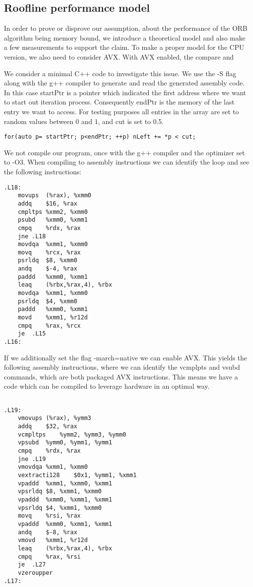 \documentclass[]{article}
\begin{document}
\subsection{Roofline performance model}


In order to prove or disprove our assumption, about the performance of the ORB algorithm being memory bound, we introduce a theoretical model and also make a few measurements to support the claim. 
To make a proper model for the CPU version, we also need to consider AVX. With AVX enabled, the compare and 

We consider a minimal C++ code to investigate this issue. We use the -S flag along with the g++ compiler to generate and read the generated assembly code. In this case startPtr is a pointer which indicated the first address where we want to start out iteration process. Consequently endPtr is the memory of the last entry we want to access. For testing purposes all entries in the array are set to random values between 0 and 1, and cut is set to 0.5. 

\begin{lstlisting}
for(auto p= startPtr; p<endPtr; ++p) nLeft += *p < cut;
\end{lstlisting}

We not compile our program, once with the g++ compiler and the optimizer set to -O3. 
When compiling to assembly instructions we can identify the loop and see the following instructions:
\begin{lstlisting}
.L18:
	movups	(%rax), %xmm0
	addq	$16, %rax
	cmpltps	%xmm2, %xmm0
	psubd	%xmm0, %xmm1
	cmpq	%rdx, %rax
	jne	.L18
	movdqa	%xmm1, %xmm0
	movq	%rcx, %rax
	psrldq	$8, %xmm0
	andq	$-4, %rax
	paddd	%xmm0, %xmm1
	leaq	(%rbx,%rax,4), %rbx
	movdqa	%xmm1, %xmm0
	psrldq	$4, %xmm0
	paddd	%xmm0, %xmm1
	movd	%xmm1, %r12d
	cmpq	%rax, %rcx
	je	.L15
.L16:
\end{lstlisting}

If we additionally set the flag -march=native we can enable AVX. This yields the following assembly instructions, where we can identify the vcmplpts and vsubd commands, which are both packaged AVX instructions. This means we have a code which can be compiled to leverage hardware in an optimal way.

\begin{lstlisting}
	
.L19:
	vmovups	(%rax), %ymm3
	addq	$32, %rax
	vcmpltps	%ymm2, %ymm3, %ymm0
	vpsubd	%ymm0, %ymm1, %ymm1
	cmpq	%rdx, %rax
	jne	.L19
	vmovdqa	%xmm1, %xmm0
	vextracti128	$0x1, %ymm1, %xmm1
	vpaddd	%xmm1, %xmm0, %xmm1
	vpsrldq	$8, %xmm1, %xmm0
	vpaddd	%xmm0, %xmm1, %xmm1
	vpsrldq	$4, %xmm1, %xmm0
	movq	%rsi, %rax
	vpaddd	%xmm0, %xmm1, %xmm1
	andq	$-8, %rax
	vmovd	%xmm1, %r12d
	leaq	(%rbx,%rax,4), %rbx
	cmpq	%rax, %rsi
	je	.L27
	vzeroupper
.L17:	

\end{lstlisting}
\end{document}
